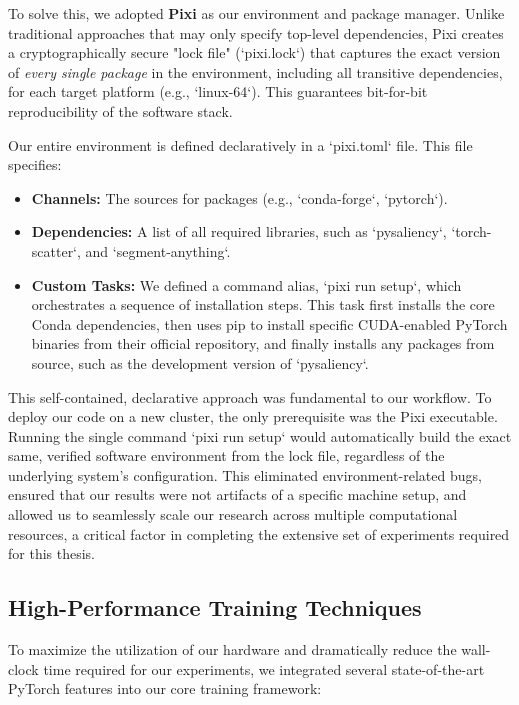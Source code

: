 To solve this, we adopted \textbf{Pixi} as our environment and package manager. Unlike traditional approaches that may only specify top-level dependencies, Pixi creates a cryptographically secure "lock file" (`pixi.lock`) that captures the exact version of \textit{every single package} in the environment, including all transitive dependencies, for each target platform (e.g., `linux-64`). This guarantees bit-for-bit reproducibility of the software stack.

Our entire environment is defined declaratively in a `pixi.toml` file. This file specifies:
\begin{itemize}
    \item \textbf{Channels:} The sources for packages (e.g., `conda-forge`, `pytorch`).
    \item \textbf{Dependencies:} A list of all required libraries, such as `pysaliency`, `torch-scatter`, and `segment-anything`.
    \item \textbf{Custom Tasks:} We defined a command alias, `pixi run setup`, which orchestrates a sequence of installation steps. This task first installs the core Conda dependencies, then uses pip to install specific CUDA-enabled PyTorch binaries from their official repository, and finally installs any packages from source, such as the development version of `pysaliency`.
\end{itemize}

This self-contained, declarative approach was fundamental to our workflow. To deploy our code on a new cluster, the only prerequisite was the Pixi executable. Running the single command `pixi run setup` would automatically build the exact same, verified software environment from the lock file, regardless of the underlying system's configuration. This eliminated environment-related bugs, ensured that our results were not artifacts of a specific machine setup, and allowed us to seamlessly scale our research across multiple computational resources, a critical factor in completing the extensive set of experiments required for this thesis.


\subsection{High-Performance Training Techniques}
To maximize the utilization of our hardware and dramatically reduce the wall-clock time required for our experiments, we integrated several state-of-the-art PyTorch features into our core training framework:

